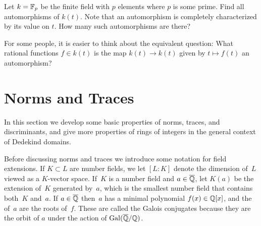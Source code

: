 \begin{exercise}
  Let $k = \mathbb{F}_p$ be the finite field with $p$ elements where $p$ is some prime. Find all automorphisms of $k(t)$. Note that an automorphism is completely characterized by its value on $t$. How many such automorphisms are there?

  \begin{hint}
    For some people, it is easier to think about the equivalent question: What rational functions $f\in k(t)$ is the map $k(t)\to k(t)$ given by $t\mapsto f(t)$ an automorphism?
  \end{hint}
\end{exercise}

\section{Norms and Traces}

In this section we develop some basic properties of norms, traces, and
discriminants, and give more properties of rings of integers in the
general context of Dedekind domains.

Before discussing norms and traces we introduce some notation for
field extensions.  If $K\subset L$ are number fields, we let $[L:K]$
denote the dimension of~$L$ viewed as a $K$-vector space.  If~$K$ is a
number field and $a\in \overline{\mathbb{Q}}$, let $K(a)$ be the extension of~$K$
generated by~$a$, which is the smallest number field that contains
both~$K$ and~$a$.  If $a\in\overline{\mathbb{Q}}$ then~$a$ has a minimal polynomial
$f(x)\in\mathbb{Q}[x]$, and the  of~$a$ are the roots
of~$f$. These are called the Galois conjugates because they are the orbit
of $a$ under the action of $\operatorname{Gal}(\overline{\mathbb{Q}}/\mathbb{Q})$.

